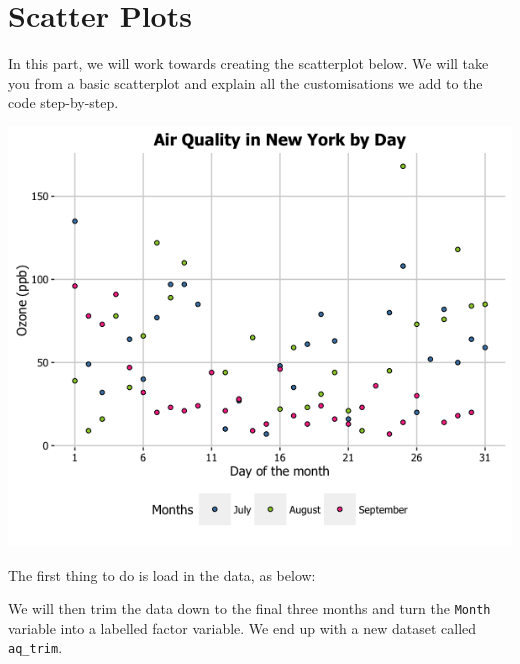 \chapter{Scatter Plots}\label{scatter-plots}

In this part, we will work towards creating the scatterplot below. We
will take you from a basic scatterplot and explain all the
customisations we add to the code step-by-step.

\begin{center}\includegraphics[width=0.55\linewidth]{0_all_posts_pdf/scatter_finalgraph-1} \end{center}

The first thing to do is load in the data, as below:

\begin{Shaded}
\begin{Highlighting}[]
\end{Highlighting}
\end{Shaded}

We will then trim the data down to the final three months and turn the
\texttt{Month} variable into a labelled factor variable. We end up with
a new dataset called \texttt{aq\_trim}.

\begin{Shaded}
\begin{Highlighting}[]
\StringTok{ }\NormalTok{airquality[}\StringTok{ } \NormalTok{|}
\StringTok{ } \NormalTok{|}
\StringTok{ }\NormalTok{), ]}
\StringTok{ }
 \NormalTok{(}\NormalTok{, }\NormalTok{, }\NormalTok{))}
\end{Highlighting}
\end{Shaded}

